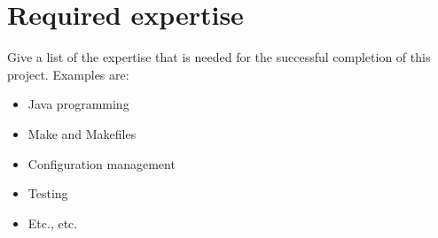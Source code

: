 \chapter{Required expertise}

Give a list of the expertise that is needed for the successful completion of this project. Examples are:
\begin{itemize}
\item Java programming
\item Make and Makefiles
\item Configuration management
\item Testing
\item Etc., etc.
\end{itemize}

\lipsum[17]
